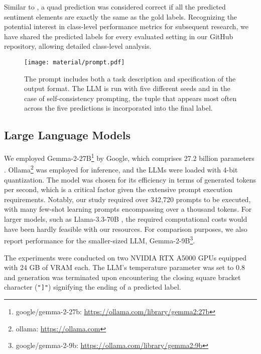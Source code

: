 
Similar to \citet{zhang2021aspect}, a quad prediction was considered correct if all the predicted sentiment elements are exactly the same as the gold labels. Recognizing the potential interest in class-level performance metrics for subsequent research, we have shared the predicted labels for every evaluated setting in our GitHub repository, allowing detailed class-level analysis.

\begin{figure*}[!htbp]
    \centering
    \texttt{[image: material/prompt.pdf]}
    \caption{The prompt includes both a task description and specification of the output format. The LLM is run with five different seeds and in the case of self-consistency prompting, the tuple that appears most often across the five predictions is incorporated into the final label.}

\end{figure*}
\label{figure:study-prompt}

\subsection{Large Language Models}

We employed Gemma-2-27B\footnote{google/gemma-2-27b: \url{https://ollama.com/library/gemma2:27b}} by Google, which comprises 27.2 billion parameters \citep{team2024gemma}. Ollama\footnote{ollama: \url{https://ollama.com}} was employed for inference, and the LLMs were loaded with 4-bit quantization. The model was chosen for its efficiency in terms of generated tokens per second, which is a critical factor given the extensive prompt execution requirements. Notably, our study required over 342,720 prompts to be executed, with many few-shot learning prompts encompassing over a thousand tokens. For larger models, such as Llama-3.3-70B \citet{dubey2024llama}, the required computational costs would have been hardly feasible with our resources. For comparison purposes, we also report performance for the smaller-sized LLM, Gemma-2-9B\footnote{google/gemma-2-9b: \url{https://ollama.com/library/gemma2:9b}}.

The experiments were conducted on two NVIDIA RTX A5000 GPUs equipped with 24 GB of VRAM each. The LLM's temperature parameter was set to 0.8 and generation was terminated upon encountering the closing square bracket character (\texttt{"]"}) signifying the ending of a predicted label.

